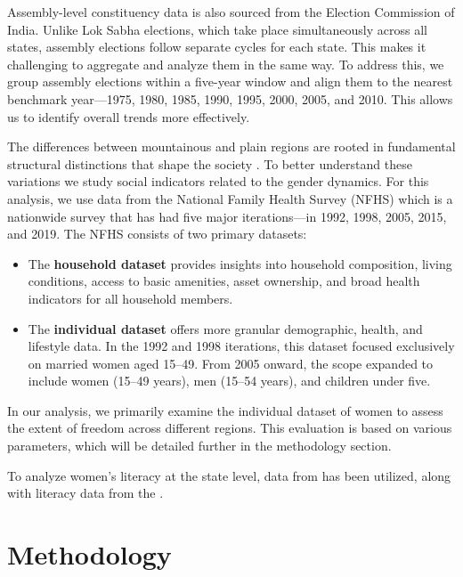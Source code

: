 Assembly-level constituency data is also sourced from the Election Commission of India. Unlike Lok Sabha elections, which take place simultaneously across all states, assembly elections follow separate cycles for each state. This makes it challenging to aggregate and analyze them in the same way. To address this, we group assembly elections within a five-year window and align them to the nearest benchmark year—1975, 1980, 1985, 1990, 1995, 2000, 2005, and 2010. This allows us to identify overall trends more effectively.

\vspace{0.3 cm}

The differences between mountainous and plain regions  are rooted in fundamental structural distinctions that shape the society \citep{jamesscott}. To better understand these variations we study social indicators related to the gender dynamics. For this analysis, we use data from the National Family Health Survey (NFHS) which is a  nationwide survey that has had five major iterations—in 1992, 1998, 2005, 2015, and 2019. The NFHS consists of two primary datasets: 

\begin{itemize}
    \item The \textbf{household dataset} provides insights into household composition, living conditions, access to basic amenities, asset ownership, and broad health indicators for all household members.
\item The \textbf{individual dataset} offers more granular demographic, health, and lifestyle data. In the 1992 and 1998 iterations, this dataset focused exclusively on married women aged 15–49. From 2005 onward, the scope expanded to include women (15–49 years), men (15–54 years), and children under five.
\end{itemize}

In our analysis, we primarily examine the individual dataset of women to assess the extent of freedom across different regions. This evaluation is based on various parameters, which will be detailed further in the methodology section.

\vspace{0.3 cm}

To analyze women's literacy at the state level, data from \cite{census1991,census2001,census2011} has been utilized, along with literacy data from the \cite{NSC2017}.

\section{Methodology}

